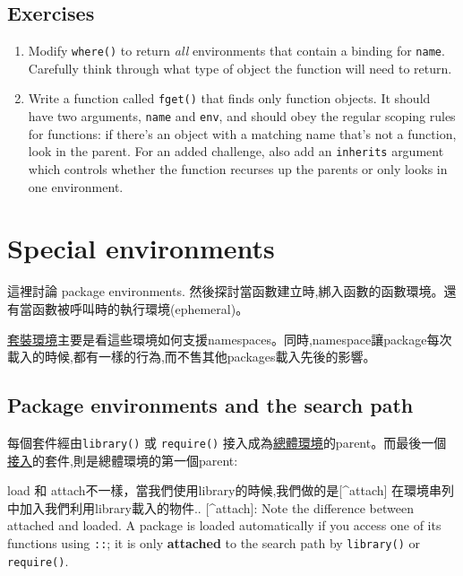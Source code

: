 \documentclass[]{book}
\theoremstyle{definition}
\theoremstyle{definition}
\theoremstyle{definition}
\theoremstyle{remark}
\begin{document}
\hypertarget{exercises-7}{%
\subsection{Exercises}\label{exercises-7}}

\begin{enumerate}
\def\labelenumi{\arabic{enumi}.}
\item
  Modify \texttt{where()} to return \emph{all} environments that contain
  a binding for \texttt{name}. Carefully think through what type of
  object the function will need to return.
\item
  Write a function called \texttt{fget()} that finds only function
  objects. It should have two arguments, \texttt{name} and \texttt{env},
  and should obey the regular scoping rules for functions: if there's an
  object with a matching name that's not a function, look in the parent.
  For an added challenge, also add an \texttt{inherits} argument which
  controls whether the function recurses up the parents or only looks in
  one environment.
\end{enumerate}

\hypertarget{function-envs}{%
\section{Special environments}\label{function-envs}}

這裡討論 package environments.
然後探討當函數建立時,綁入函數的函數環境。還有當函數被呼叫時的執行環境(ephemeral)。

\href{package-environments}{套裝環境}主要是看這些環境如何支援namespaces。同時,namespace讓package每次載入的時候,都有一樣的行為,而不售其他packages載入先後的影響。

\hypertarget{package-environments-and-the-search-path}{%
\subsection{Package environments and the search
path}\label{package-environments-and-the-search-path}}

每個套件經由\texttt{library()} 或 \texttt{require()}
接入成為\protect\hyperlink{global-environment}{總體環境}的parent。而最後一個\protect\hyperlink{attach}{接入}的套件,則是總體環境的第一個parent:

load 和 attach不一樣，當我們使用library的時候,我們做的是{[}\^{}attach{]}
在環境串列中加入我們利用library載入的物件.. {[}\^{}attach{]}: Note the
difference between attached and loaded. A package is loaded
automatically if you access one of its functions using \texttt{::}; it
is only \textbf{attached} to the search path by \texttt{library()} or
\texttt{require()}.
\end{document}
